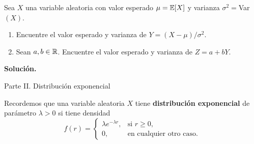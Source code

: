 \documentclass[11pt]{scrartcl}
\begin{document}
\begin{mdframed}[style=mdpurplebox, frametitle={Ejercicio 02, Tarea 11, Probabilidad y Estadística I}]
    Sea $X$ una variable aleatoria con valor esperado $\mu = \mathbb E[X]$ y varianza $\sigma^2=$Var$(X)$.
    \begin{enumerate}
        \item Encuentre el valor esperado y varianza de $Y=(X-\mu)/\sigma^2$.
        \item Sean $a,b \in \mathbb R$. Encuentre el valor esperado y varianza de $Z=a+bY$.
    \end{enumerate}
\end{mdframed}
\textbf{Solución.}


\begin{center}
    Parte II. Distribución exponencial
\end{center}

\noindent Recordemos que una variable aleatoria $X$ tiene \textbf{distribución exponencial} de parámetro $\lambda > 0$
si tiene densidad
\begin{equation*}
    f(r)=
    \begin{cases}
        \lambda e^{-\lambda r}, & \text{si } r\geq 0, \\
        0, & \text{en cualquier otro caso}.
    \end{cases}
\end{equation*}
\end{document}

